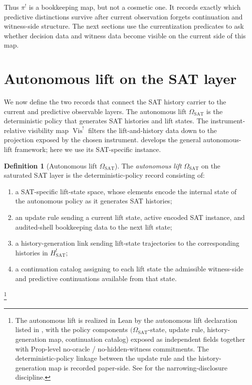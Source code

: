 \documentclass[11pt]{article}
\newcommand{\Hsat}{H^{!}_{\mathrm{SAT}}}
\newcommand{\ComparisonMap}{\pi^{!}}
\newcommand{\OmegaSAT}{\Omega_{\mathrm{SAT}}}
\newcommand{\VisBang}{\operatorname{Vis}^{!}}
\theoremstyle{definition}
\newtheorem{definition}[theorem]{Definition}
\begin{document}
Thus \(\ComparisonMap\) is a bookkeeping map, but not a cosmetic one.
It records exactly which predictive distinctions survive after current
observation forgets continuation and witness-side structure.  The next
sections use the currentization predicates to ask whether decision
data and witness data become visible on the current side of this map.
 

\section{Autonomous lift on the SAT layer}
\label{sec:autonomous-lift}

We now define the two records that connect the SAT history carrier to
the current and predictive observable layers.  The autonomous lift
\(\OmegaSAT\) is the deterministic policy that generates SAT histories
and lift states.  The instrument-relative visibility map \(\VisBang\)
filters the lift-and-history data down to the projection exposed by
the chosen instrument.  \citet{TsiokosHiddenness2026} develops the
general autonomous-lift framework; here we use its SAT-specific
instance.

\begin{definition}[Autonomous lift \(\OmegaSAT\)]
\label{def:pvnp:omega-sat}
The \emph{autonomous lift} \(\OmegaSAT\) on the saturated SAT layer is
the deterministic-policy record consisting of:
\begin{enumerate}
  \item a SAT-specific lift-state space, whose elements encode the
  internal state of the autonomous policy as it generates SAT
  histories;
  \item an update rule sending a current lift state, active encoded
  SAT instance, and audited-shell bookkeeping data to the next lift
  state;
  \item a history-generation link sending lift-state trajectories to
  the corresponding histories in \(\Hsat\);
  \item a continuation catalog assigning to each lift state the
  admissible witness-side and predictive continuations available from
  that state.
\end{enumerate}
\footnote{The autonomous lift is realized in Lean by the autonomous
lift declaration listed in , with the policy
components \((\OmegaSAT\)-state, update rule, history-generation map,
continuation catalog) exposed as independent fields together with
Prop-level no-oracle / no-hidden-witness commitments.  The
deterministic-policy linkage between the update rule and the
history-generation map is recorded paper-side.  See
 for the narrowing-disclosure discipline.}
\end{definition}
\end{document}
